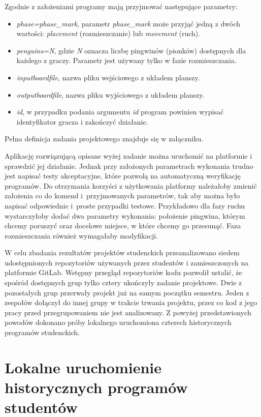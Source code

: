 Zgodnie z założeniami programy mają przyjmować następujące parametry:
\begin{itemize}
    \item \textit{phase=phase\_mark}, parametr \textit{phase\_mark} może przyjąć jedną z dwóch wartości: \textit{placement} (rozmieszczanie) lub \textit{movement} (ruch).
    \item \textit{penguins=N}, gdzie \textit{N} oznacza liczbę pingwinów (pionków) dostępnych dla każdego z graczy.
    Parametr jest używany tylko w fazie rozmieszczania.
    \item \textit{inputboardfile}, nazwa pliku wejściowego z układem planszy.
    \item \textit{outputboardfile}, nazwa pliku wyjściowego z układem planszy.
    \item \textit{id}, w przypadku podania argumentu \textit{id} program powinien wypisać identyfikator gracza i zakończyć działanie.
\end{itemize}
Pełna definicja zadania projektowego znajduje się w załączniku.

Aplikację rozwiązującą opisane wyżej zadanie można uruchomić na platformie i sprawdzić jej działanie.
Jednak przy założonych parametrach wykonania trudno jest napisać testy akceptacyjne, które pozwolą na automatyczną weryfikację programów.
Do otrzymania korzyści z użytkowania platformy należałoby zmienić założenia co do komend i~przyjmowanych parametrów, tak aby można było napisać odpowiednie i~proste przypadki testowe.
Przykładowo dla fazy ruchu wystarczyłoby dodać dwa parametry wykonania: położenie pingwina, którym chcemy poruszyć oraz docelowe miejsce, w które chcemy go przesunąć.
Faza rozmieszczania również wymagałaby modyfikacji.

W celu zbadania rezultatów projektów studenckich przeanalizowano siedem udostępnionych repozytoriów używanych przez studentów i zamieszczonych na platformie GitLab.
Wstępny przegląd repozytoriów kodu pozwolił ustalić, że spośród dostępnych grup tylko cztery ukończyły zadanie projektowe.
Dwie z pozostałych grup przerwały projekt już na samym początku semestru.
Jeden z zespołów dołączył do innej grupy w trakcie trwania projektu, przez co kod z jego pracy przed przegrupowaniem nie jest analizowany.
Z powyżej przedstawionych powodów dokonano próby lokalnego uruchomiona czterech historycznych programów studenckich.

\section{Lokalne uruchomienie historycznych programów studentów}

